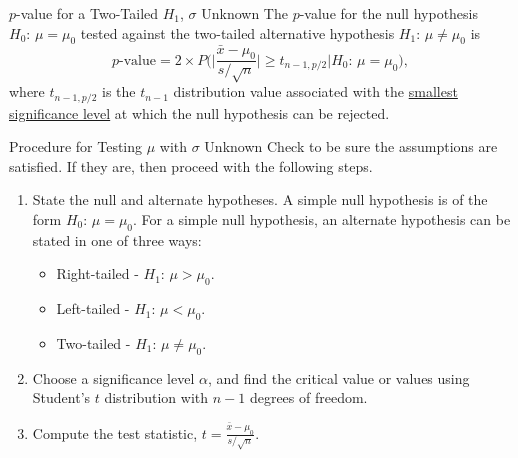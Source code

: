 \documentclass[pdf]{beamer}
\theoremstyle{remark}
\theoremstyle{definition}
\begin{document}
\begin{frame}[t]{$p$-value  for a Two-Tailed $H_1$, $\sigma$ Unknown}
The $p$-value for the null hypothesis $H_0\text{: }  \mu = \mu_0$ tested against the two-tailed alternative hypothesis $H_1\text{: }  \mu \neq \mu_0$ is \\
\vspace{1.5ex}
\begin{equation}
p\text{-value} = 2 \times P\bigg( \bigg| \frac{\bar{x} - \mu_0}{s/ \sqrt{n}} \bigg| \geq t_{n-1,p/2} | H_0\text{: }  \mu = \mu_0 \bigg),
\end{equation}
where $t_{n-1,p/2}$ is the $t_{n-1}$ distribution value associated with the \underline{smallest significance level} at which the null hypothesis can be rejected. \\
\end{frame}

\begin{frame}[t]{Procedure for Testing $\mu$ with $\sigma$ Unknown }
Check to be sure the assumptions are satisfied. If they are, then proceed with the following steps. \\
\vspace{1.5ex}
\begin{enumerate}
\item State the null and alternate hypotheses. A simple null hypothesis is of the form $H_0\text{: }  \mu =\mu_0$. For a simple null hypothesis, an alternate hypothesis can be stated in one of three ways:
 \begin{itemize}
  \item Right-tailed - $H_1\text{: }  \mu > \mu_0$.
  \item Left-tailed - $H_1\text{: }  \mu < \mu_0$.
  \item Two-tailed - $H_1\text{: }  \mu \ne \mu_0$.
\end{itemize}
\item Choose a significance level $\alpha$, and find the critical value or values using Student's $t$ distribution with $n-1$ degrees of freedom.
\item Compute the test statistic, $t =\frac{\bar{x} - \mu_0}{s/\sqrt{n}}$. 
\end{enumerate}
\end{frame}
\end{document}
